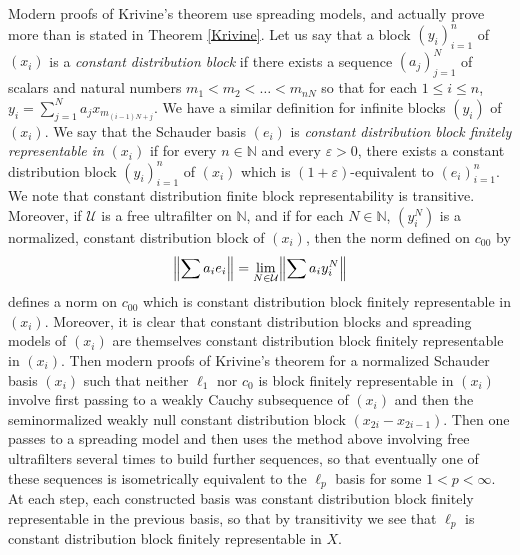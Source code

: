 \documentclass[12pt]{amsart}
\theoremstyle{definition}
\newcommand{\nn}{\mathbb{N}}
\newcommand{\uuu}{\mathcal{U}}
\begin{document}
Modern proofs of Krivine's theorem use spreading models, and actually prove more than is stated in Theorem \ref{Krivine}. Let us say that a block $(y_i)_{i=1}^n$ of $(x_i)$ is a \emph{constant distribution block} if there exists a sequence $(a_j)_{j=1}^N$ of scalars and natural numbers $m_1<m_2<\ldots< m_{nN}$ so that for each $1\leqslant i\leqslant n$, $y_i=\sum_{j=1}^{N} a_j x_{m_{(i-1)N+j}}$.  We have a similar definition for infinite blocks $(y_i)$ of $(x_i)$.  We say that the Schauder basis $(e_i)$ is \emph{constant distribution block finitely representable in} $(x_i)$ if for every $n\in \nn$ and every $\varepsilon>0$, there exists a constant distribution block $(y_i)_{i=1}^n$ of $(x_i)$ which is $(1+\varepsilon)$-equivalent to $(e_i)_{i=1}^n$.  We note that constant distribution finite block representability is transitive.  Moreover, if $\uuu$ is a free ultrafilter on $\nn$, and if for each $N\in \nn$, $(y_i^N)$ is a normalized, constant distribution block of $(x_i)$, then the norm defined on $c_{00}$ by $$\Bigl\|\sum a_i e_i\Bigr\| = \lim_{N\in \uuu} \Bigl\|\sum a_i y_i^N\Bigr\|$$ defines a norm on $c_{00}$ which is constant distribution block finitely representable in $(x_i)$.  Moreover, it is clear that constant distribution blocks and spreading models of $(x_i)$ are themselves constant distribution block finitely representable in $(x_i)$.  Then modern proofs of Krivine's theorem for a normalized Schauder basis $(x_i)$ such that neither $\ell_1$ nor $c_0$ is block finitely representable in $(x_i)$ involve first passing to a weakly Cauchy subsequence of $(x_i)$ and then the seminormalized weakly null constant distribution block $(x_{2i}-x_{2i-1})$.  Then one passes to a spreading model and then uses the method above involving free ultrafilters several times to build further sequences, so that eventually one of these sequences is isometrically equivalent to the $\ell_p$ basis for some $1<p<\infty$. At each step, each constructed basis was constant distribution block finitely representable in the previous basis, so that by transitivity we see that $\ell_p$ is constant distribution block finitely representable in $X$.  
\end{document}
